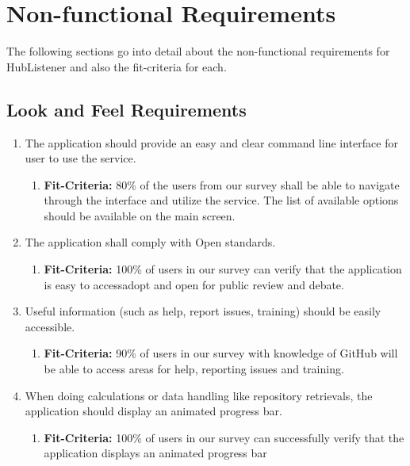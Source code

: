 \documentclass{article}
\begin{document}
\section{Non-functional Requirements}

The following sections go into detail about the non-functional requirements for HubListener and also the fit-criteria for each. \newline

\subsection{Look and Feel Requirements}
\begin{enumerate}
\item The application should provide an easy and clear command line interface for user to use the service.
   \begin{enumerate}
    \item \textbf{Fit-Criteria:} 80\% of the users from our survey shall be able to navigate through the interface and utilize the service. The list of available options should be available on the main screen. 
    \end{enumerate}
\item The application shall comply with Open standards.
   \begin{enumerate}
    \item \textbf{Fit-Criteria:} 100\% of users in our survey  can verify that the application is easy to access\/adopt and open for public review and debate.
    \end{enumerate}
\item Useful information (such as help, report issues, training) should be easily accessible.
   \begin{enumerate}
    \item \textbf{Fit-Criteria:} 90\% of users in our survey with knowledge of GitHub will be able to access areas for help, reporting issues and training. 
    \end{enumerate}
\item When doing calculations or data handling like repository retrievals, the application should display an animated progress bar. 
   \begin{enumerate}
    \item \textbf{Fit-Criteria:}  100\% of users in our survey  can successfully verify that the application displays an animated progress bar 
    \end{enumerate}
\end{enumerate}
\end{document}
